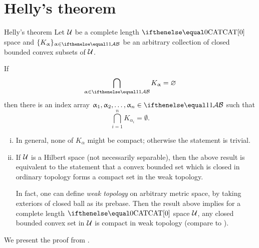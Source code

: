 \section{Helly's theorem}\label{sec:helly}


\begin{thm}{Helly's theorem}\label{thm:helly}
Let $\mathcal{U}$  be a complete length $\CAT0$ space
and $\{K_\alpha\}_{\alpha\in \IndexSet}$ be an arbitrary collection of closed bounded convex subsets of $\mathcal{U}$.

If 
\[\bigcap_{\alpha\in \IndexSet}K_\alpha=\emptyset\]
then there is an index array $\alpha_1,\alpha_2,\dots,\alpha_n\in \IndexSet$ such that
\[\bigcap_{i=1}^nK_{\alpha_i}=\emptyset.\]

\end{thm}

\begin{enumerate}[(i)]
\item In general, none of $K_\alpha$ might be compact; 
otherwise the statement is trivial.
\item If $\mathcal{U}$ is a Hilbert space (not necessarily separable), 
then the above result is equivalent to the statement that a convex bounded set 
which is closed in ordinary topology forms a compact set in the weak topology.

In fact, one can define \emph{weak topology} on arbitrary metric space, by taking exteriors of closed ball as its prebase.
Then the result above implies for  a complete length $\CAT0$ space $\mathcal{U}$, any closed bounded convex set in $\mathcal{U}$ is compact in weak topology 
(compare to \cite{monod}).
\end{enumerate}

\medskip

We present the proof from \cite{lang-schroeder}.

%

